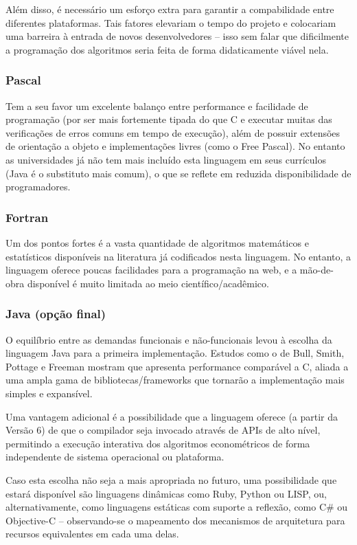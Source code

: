 \documentclass{abnt}
\begin{document}
Além disso, é necessário um esforço extra para garantir a compabilidade entre diferentes plataformas. Tais fatores elevariam o tempo do  projeto e colocariam uma barreira à entrada de novos desenvolvedores – isso sem falar que dificilmente a programação dos algoritmos seria feita de forma didaticamente viável nela.

\subsubsection{Pascal}
Tem a seu favor um excelente balanço entre performance e facilidade de programação (por ser mais fortemente tipada do que C e executar muitas das verificações de erros comuns em tempo de execução), além de possuir extensões de orientação a objeto e implementações livres (como o Free Pascal). No entanto as universidades já não tem mais incluído esta linguagem em seus currículos (Java é o substituto mais comum), o que se reflete em reduzida disponibilidade de programadores.

\subsubsection{Fortran}
Um dos pontos fortes é a vasta quantidade de algoritmos matemáticos e estatísticos disponíveis na literatura já codificados nesta linguagem. No entanto, a linguagem oferece poucas facilidades para a programação na web, e a mão-de-obra disponível é muito limitada ao meio científico/acadêmico.

\subsubsection{Java (opção final)}
O equilíbrio entre as demandas funcionais e não-funcionais levou à escolha da linguagem Java para a primeira implementação. Estudos como o de Bull, Smith, Pottage e Freeman\cite{BullSmithPottageFreeman} mostram que apresenta performance comparável a C, aliada a uma ampla gama de bibliotecas/frameworks que tornarão a implementação mais simples e expansível.

Uma vantagem adicional é a possibilidade que a linguagem oferece (a partir da Versão 6) de que o compilador seja invocado através de APIs de alto nível, permitindo a execução interativa dos algoritmos econométricos de forma independente de sistema operacional ou plataforma.

Caso esta escolha não seja a mais apropriada no futuro, uma possibilidade que estará disponível são  linguagens dinâmicas como Ruby, Python ou LISP, ou, alternativamente, como linguagens estáticas com suporte a reflexão, como C\# ou Objective-C – observando-se o mapeamento dos mecanismos de arquitetura para recursos equivalentes em cada uma delas.
\end{document}
